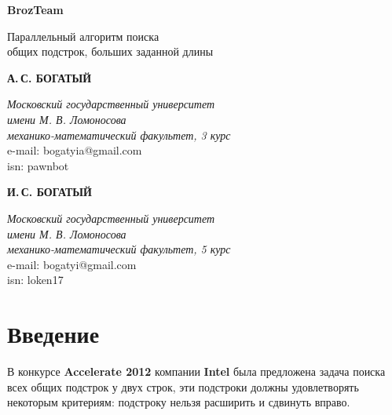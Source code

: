 \documentclass[12pt,a4paper]{article}
\begin{document}
\newcommand{\parw}[2]{\dfrac{\partial #1}{\partial #2}}
\newcommand{\pl}{p_{\lambda}}
\newcommand{\pa}{p_{a}}
\newcommand{\mn}[1]{ \{ {#1} \} }
\newcommand{\pgm}{p_{m, \sigma^2}}
\newcommand{\pma}{p_{M, a}}
\newcommand{\xseqn}{x_1, \ldots, x_n}
\newcommand{\nd}[1]{\frac{1}{\sqrt{2 \pi #1^2}} \exp ( -{\frac{x^2}{2 #1^2}} ) }
\newcommand{\ndm}[2]{\frac{1}{\sqrt{2 \pi #2^2}} \exp ( - {\frac{(x - #1)^2}{2 #2^2}})}
\newcommand{\ndms}[3]{\frac{1}{(\sqrt{2 \pi #2^2})^n} \exp ( - \sum\limits_{i = 1}^{#3}{\frac{(x_i - #1)^2}{2 #2^2}})}
\renewcommand{\le}{\leqslant}
\renewcommand{\ge}{\geqslant}

\newcommand*{\hm}[1]{#1\nobreak\discretionary{}%
{\hbox{$\mathsurround=0pt #1$}}{}}

\begin{titlepage}
\begin{center}
\huge{\textbf{BrozTeam}

\bigskip
\Large{Параллельный алгоритм поиска\\общих подстрок, больших заданной длины}}
\end{center}

\begin{flushright}
\textbf{А.\,С. БОГАТЫЙ}

\textit{Московский государственный университет\\имени М. В. Ломоносова\\механико-математический факультет, 3 курс\\}
e-mail: bogatyia@gmail.com\\
isn: pawnbot

\bigskip
\textbf{И.\,С. БОГАТЫЙ}

\textit{Московский государственный университет\\имени М. В. Ломоносова\\механико-математический факультет, 5 курс\\}
e-mail: bogatyi@gmail.com\\
isn: loken17
\\[70pt]
\end{flushright}

\end{titlepage}


\section{Введение}
В конкурсе \textbf{Accelerate 2012} компании \textbf{Intel} была предложена задача поиска всех общих подстрок у двух строк, эти подстроки должны удовлетворять некоторым критериям: подстроку нельзя расширить и сдвинуть вправо.
\end{document}

